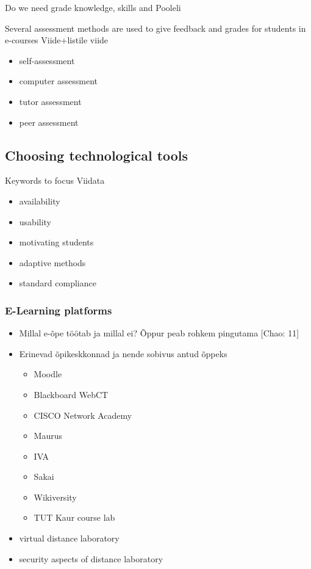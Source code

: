 Do we need grade knowledge, skills and {\color{red} Pooleli }

Several assessment methods are used to give feedback and grades for students in e-courses {\color{red} Viide+listile viide }

\begin{itemize}
	\item self-assessment
	\item computer assessment
	\item tutor assessment
	\item peer assessment
\end{itemize}
\subsection{Choosing technological tools}
Keywords to focus {\color{red} Viidata }
\begin{itemize}
	\item availability
	\item usability 
	\item motivating students
	\item adaptive methods
	\item standard compliance
\end{itemize}
\subsubsection{E-Learning platforms}

\begin{itemize}
	\item Millal e-õpe töötab ja millal ei? Õppur peab rohkem pingutama [Chao: 11]
	\item Erinevad õpikeskkonnad ja nende sobivus antud õppeks
		\begin{itemize}
			\item Moodle
			\item Blackboard WebCT
			\item CISCO Network Academy
			\item Maurus
			\item IVA
			\item Sakai
			\item Wikiversity
			\item TUT Kaur course lab
		\end{itemize}
	\item virtual distance laboratory
	\item security aspects of distance laboratory
\end{itemize}



